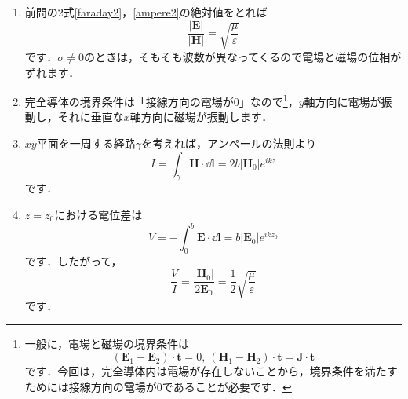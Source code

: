 \documentclass[a4paper,pdflatex,ja=standard]{bxjsarticle}
\begin{document}
\begin{enumerate}
  \item 

  前問の2式\eqref{faraday2}，\eqref{ampere2}の絶対値をとれば
  \begin{equation}
    \frac{|\bm{E}|}{|\bm{H}|}
    =
    \sqrt{\frac{\mu}{\varepsilon}}
  \end{equation}
  です．$\sigma\neq 0$のときは，そもそも波数が異なってくるので電場と磁場の位相がずれます．


  \item 

  完全導体の境界条件は「接線方向の電場が0」なので\footnote{
    一般に，電場と磁場の境界条件は
    $$
      (\bm{E}_1-\bm{E}_2)\cdot\bm{t}
      =
      0
      ,\ 
      (\bm{H}_1-\bm{H}_2)\cdot\bm{t}
      =
      \bm{J}\cdot\bm{t}
    $$
    です．今回は，完全導体内は電場が存在しないことから，境界条件を満たすためには接線方向の電場が0であることが必要です．
  }，$y$軸方向に電場が振動し，それに垂直な$x$軸方向に磁場が振動します．


  \item 

  $xy$平面を一周する経路$\gamma$を考えれば，アンペールの法則より
  \begin{equation}
    I=\int_{\gamma}\bm{H}\cdot\dd\bm{l}
    =
    2b|\bm{H}_0|e^{ikz}
  \end{equation}
  です．


  \item 

  $z=z_0$における電位差は
  \begin{equation}
    V
    =
    -\int_{0}^{b}
    \bm{E}\cdot\dd\bm{l}
    =
    b|\bm{E}_0|e^{ikz_0}
  \end{equation}
  です．したがって，
  \begin{equation}
    \frac{V}{I}
    =
    \frac{|\bm{H}_0|}{2{\bm{E}_0}}
    =
    \frac{1}{2}\sqrt{\frac{\mu}{\varepsilon}}
  \end{equation}
  です．


\end{enumerate}
\end{document}
